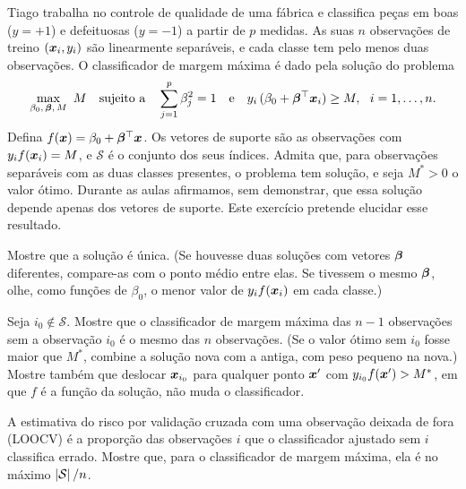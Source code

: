 Tiago trabalha no controle de qualidade de uma fábrica e classifica peças em boas ($y=+1$) e
defeituosas ($y=-1$) a partir de $p$ medidas. As suas $n$ observações de treino
$(\bm{x}_i,y_i)$ são linearmente separáveis, e cada classe tem pelo menos duas observações. O
classificador de margem máxima é dado pela solução do problema
\[
  \max_{\beta_0,\,\bm{\beta},\,M}\ M
  \quad\text{sujeito a}\quad
  \sum_{j=1}^p\beta_j^2=1
  \quad\text{e}\quad
  y_i\,(\beta_0+\bm{\beta}^\top\bm{x}_i)\ge M,\ \ i=1,\dots,n .
\]
Defina $f(\bm{x})=\beta_0+\bm{\beta}^\top\bm{x}$. Os vetores de suporte são as observações com
$y_if(\bm{x}_i)=M$, e $\mathcal S$ é o conjunto dos seus índices. Admita que, para observações
separáveis com as duas classes presentes, o problema tem solução, e seja $M^*>0$ o valor
ótimo. Durante as aulas afirmamos, sem demonstrar, que essa solução depende apenas dos vetores de
suporte. Este exercício pretende elucidar esse resultado.
\begin{itens}
  \item {} Mostre que a solução é única. (Se houvesse duas soluções com vetores
        $\bm{\beta}$ diferentes, compare-as com o ponto médio entre elas. Se tivessem o mesmo
        $\bm{\beta}$, olhe, como funções de $\beta_0$, o menor valor de $y_if(\bm{x}_i)$ em cada
        classe.)
  \item {} Seja $i_0\notin\mathcal S$. Mostre que o classificador de margem máxima
        das $n-1$ observações sem a observação $i_0$ é o mesmo das $n$ observações. (Se o
        valor ótimo sem $i_0$ fosse maior que $M^*$, combine a solução nova com a antiga, com
        peso pequeno na nova.) Mostre também que deslocar $\bm{x}_{i_0}$ para qualquer ponto
        $\bm{x}'$ com $y_{i_0}f(\bm{x}')>M^*$, em que $f$ é a função da solução, não muda o
        classificador.
  \item {} A estimativa do risco por validação cruzada com uma observação deixada de
        fora (LOOCV) é a proporção das observações $i$ que o classificador ajustado sem $i$
        classifica errado. Mostre que, para o classificador de margem máxima, ela é no
        máximo $\left\lvert \mathcal S \right\rvert/n$.
\end{itens}

